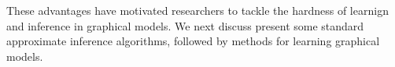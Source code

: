 These advantages have motivated researchers to tackle the hardness of learnign and inference in graphical models. We next discuss present some standard approximate inference algorithms, followed by methods for learning graphical models.
